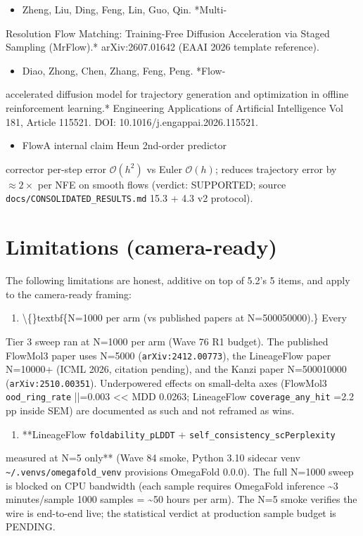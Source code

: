 \documentclass[preprint,3p,times,twocolumn]{elsarticle}
\begin{document}
\begin{itemize}
\item [Zheng 2026] Zheng, Liu, Ding, Feng, Lin, Guo, Qin. *Multi-
\end{itemize}
Resolution Flow Matching: Training-Free Diffusion Acceleration via Staged Sampling (MrFlow).* arXiv:2607.01642 (EAAI 2026 template reference).

\begin{itemize}
\item [Diao 2026] Diao, Zhong, Chen, Zhang, Feng, Peng. *Flow-
\end{itemize}
accelerated diffusion model for trajectory generation and optimization in offline reinforcement learning.* Engineering Applications of Artificial Intelligence Vol 181, Article 115521. DOI: 10.1016/j.engappai.2026.115521.

\begin{itemize}
\item [CLM-042] FlowA internal claim  Heun 2nd-order predictor
\end{itemize}
corrector per-step error $\mathcal{O}(h^2)$ vs Euler $\mathcal{O}(h)$; reduces trajectory error by $\approx 2\times$ per NFE on smooth flows (verdict: SUPPORTED; source \texttt{docs/CONSOLIDATED\_RESULTS.md} 15.3 + 4.3 v2 protocol).

\section{Limitations (camera-ready)}
The following limitations are honest, additive on top of 5.2's 5 items, and apply to the camera-ready framing:

\begin{enumerate}
\item \textbackslash\{\}textbf\{N=1000 per arm (vs published papers at N=500050000).\} Every
\end{enumerate}
Tier 3 sweep ran at N=1000 per arm (Wave 76 R1 budget). The published FlowMol3 paper uses N=5000 (\texttt{arXiv:2412.00773}), the LineageFlow paper N=10000+ (ICML 2026, citation pending), and the Kanzi paper N=500010000 (\texttt{arXiv:2510.00351}). Underpowered effects on small-delta axes (FlowMol3 \texttt{ood\_ring\_rate} ||=0.003 << MDD 0.0263; LineageFlow \texttt{coverage\_any\_hit} =2.2 pp inside SEM) are documented as such and not reframed as wins.

\begin{enumerate}
\item **LineageFlow \texttt{foldability\_pLDDT} + \texttt{self\_consistency\_scPerplexity}
\end{enumerate}
measured at N=5 only** (Wave 84 smoke, Python 3.10 sidecar venv \texttt{\textasciitilde{}/.venvs/omegafold\_venv} provisions OmegaFold 0.0.0). The full N=1000 sweep is blocked on CPU bandwidth (each sample requires OmegaFold inference \textasciitilde{}3 minutes/sample  1000 samples = \textasciitilde{}50 hours per arm). The N=5 smoke verifies the wire is end-to-end live; the statistical verdict at production sample budget is PENDING.
\end{document}
